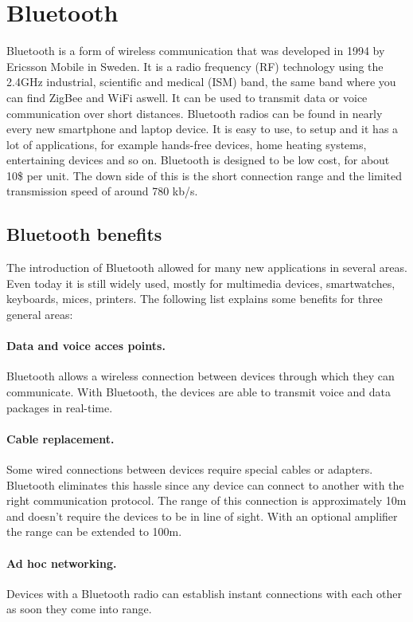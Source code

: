\documentclass[a4paper, 11pt]{report}
\begin{document}
	
\section{Bluetooth}
Bluetooth is a form of wireless communication that was developed in 1994 by Ericsson Mobile in Sweden. It is a radio frequency (RF) technology using the 2.4GHz industrial, scientific and medical (ISM) band, the same band where you can find ZigBee and WiFi aswell. It can be used to transmit data or voice communication over short distances. Bluetooth radios can be found in nearly every new smartphone and laptop device. It is easy to use, to setup and it has a lot of applications, for example hands-free devices, home heating systems, entertaining devices and so on. Bluetooth is designed to be low cost, for about 10\$ per unit. The down side of this is the short connection range and the limited transmission speed of around 780 kb/s\cite{bluetoothTech}.\\

	\subsection{Bluetooth benefits}
The introduction of Bluetooth allowed for many new applications in several areas. Even today it is still widely used, mostly for multimedia devices, smartwatches, keyboards, mices, printers. The following list explains some benefits for three general areas:
		\paragraph{Data and voice acces points.}
Bluetooth allows a wireless connection between devices through which they can communicate. With Bluetooth, the devices are able to transmit voice and data packages in real-time.
		\paragraph{Cable replacement.}
Some wired connections between devices require special cables or adapters. Bluetooth eliminates this hassle since any device can connect to another with the right communication protocol. The range of this connection is approximately 10m and doesn't require the devices to be in line of sight. With an optional amplifier the range can be extended to 100m.
		\paragraph{Ad hoc networking.}
Devices with a Bluetooth radio can establish instant connections with each other as soon they come into range.
\end{document}

